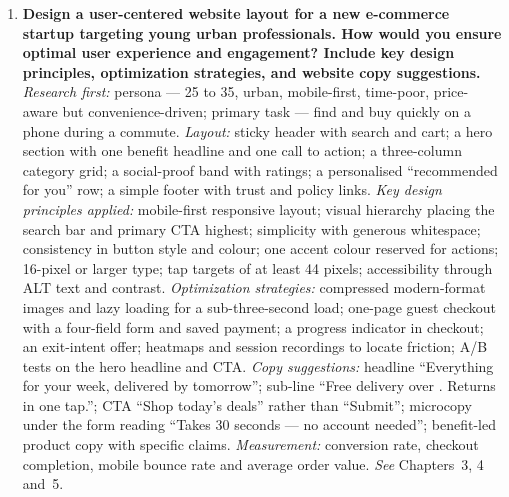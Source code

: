 \begin{enumerate}[leftmargin=2.2em,itemsep=1.4ex]
\item \textbf{Design a user-centered website layout for a new e-commerce startup
      targeting young urban professionals. How would you ensure optimal user
      experience and engagement? Include key design principles, optimization
      strategies, and website copy suggestions.}
      \\
      \emph{Research first:} persona --- 25 to 35, urban, mobile-first, time-poor,
      price-aware but convenience-driven; primary task --- find and buy quickly on
      a phone during a commute.
      \emph{Layout:} sticky header with search and cart; a hero section with one
      benefit headline and one call to action; a three-column category grid; a
      social-proof band with ratings; a personalised ``recommended for you'' row;
      a simple footer with trust and policy links.
      \emph{Key design principles applied:} mobile-first responsive layout; visual
      hierarchy placing the search bar and primary CTA highest; simplicity with
      generous whitespace; consistency in button style and colour; one accent
      colour reserved for actions; 16-pixel or larger type; tap targets of at
      least 44 pixels; accessibility through ALT text and contrast.
      \emph{Optimization strategies:} compressed modern-format images and lazy
      loading for a sub-three-second load; one-page guest checkout with a
      four-field form and saved payment; a progress indicator in checkout; an
      exit-intent offer; heatmaps and session recordings to locate friction; A/B
      tests on the hero headline and CTA.
      \emph{Copy suggestions:} headline ``Everything for your week, delivered by
      tomorrow''; sub-line ``Free delivery over . Returns in one tap.'';
      CTA ``Shop today's deals'' rather than ``Submit''; microcopy under the form
      reading ``Takes 30 seconds --- no account needed''; benefit-led product copy
      with specific claims.
      \emph{Measurement:} conversion rate, checkout completion, mobile bounce rate
      and average order value. \hfill\emph{See} Chapters~3, 4 and~5.


\end{enumerate}
